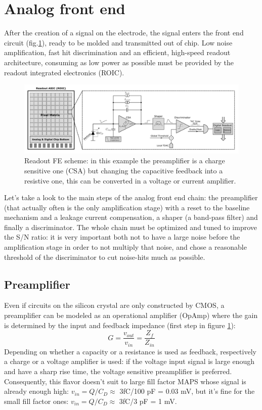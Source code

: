 \section{Analog front end}
   After the creation of a signal on the electrode, the signal enters the front end circuit (fig.\ref{fig:readout_scheme}), ready to be molded and transmitted out of chip. Low noise amplification, fast hit discrimination and an efficient, high-speed readout architecture, consuming as low power as possible  must be provided by the readout integrated electronics (ROIC).\\
   \begin{figure}
      \centering
      \includegraphics[width=1.\linewidth]{figures/Pixel_detectors/readout_scheme.png}
      \caption{Readout FE scheme: in this example the preamplifier is a charge sensitive one (CSA) but changing the capacitive feedback into a resistive one, this can be converted in a voltage or current amplifier.}
      \label{fig:readout_scheme}
   \end{figure}
   Let's take a look to the main steps of the analog front end chain: the preamplifier (that actually often is the only amplification stage) with a reset to the baseline mechanism and a leakage current compensation, a shaper (a band-pass filter) and finally a discriminator. The whole chain must be optimized and tuned to improve the S/N ratio: it is very important both not to have a large noise before the amplification stage in order to not multiply that noise, and chose a reasonable threshold of the discriminator to cut noise-hits much as possible.

   \subsection{Preamplifier}\label{subsec:preamplifier}
      Even if circuits on the silicon crystal are only constructed by CMOS, a preamplifier can be modeled as an operational amplifier (OpAmp) where the gain is determined by the input and feedback impedance (first step in figure \ref{fig:readout_scheme}):
      \begin{equation}
         G = \frac{v_{out}}{v_{in}} = \frac{Z_{f}}{Z_{in}}
      \end{equation}
      Depending on whether a capacity or a resistance is used as feedback, respectively a charge or a voltage amplifier is used: if the voltage input signal is large enough and have a sharp rise time, the voltage sensitive preamplifier is preferred. Consequently, this flavor doesn't suit to large fill factor MAPS whose signal is already enough high: $v_{in} = Q/C_{D} \approx$ 3fC/100 pF = 0.03 mV, but it's fine for the small fill factor ones: $v_{in} = Q/C_{D} \approx$ 3fC/3 pF = 1 mV.

